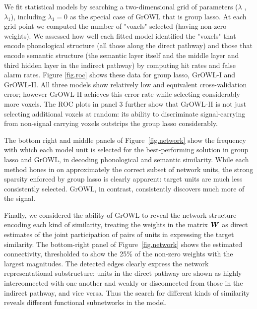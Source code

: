 We fit statistical models by searching a two-dimensional grid of parameters ($\lambda$ , $\lambda_1$), including $\lambda_1=0$ as the special case of GrOWL that is group lasso. At each grid point we computed the number of "voxels" selected (\ie having non-zero weights). We assessed how well each fitted model identified the "voxels" that encode phonological structure (all those along the direct pathway) and those that encode semantic structure (the semantic layer itself and the middle layer and third hidden layer in the indirect pathway) by computing hit rates and false alarm rates. Figure \ref{fig.roc} shows these data for group lasso, GrOWL-I and GrOWL-II. All three models show relatively low and equivalent cross-validation error; however GrOWL-II achieves this error rate while selecting considerably more voxels. The ROC plots in panel 3 further show that GrOWL-II is not just selecting additional voxels at random: its ability to discriminate signal-carrying from non-signal carrying voxels outstrips the group lasso considerably.

The bottom right and middle panels of Figure~\ref{fig.network} show the frequency with which each model unit is selected for the best-performing solution in group lasso and GrOWL, in decoding phonological and semantic similarity. While each method hones in on approximately the correct subset of network units, the strong sparsity enforced by group lasso is clearly apparent: target units are much less consistently selected. GrOWL, in contrast, consistently discovers much more of the signal. 

Finally, we considered the ability of GrOWL to reveal the network structure encoding each kind of similarity, treating the weights in the matrix $\boldsymbol{W}$ as direct estimates of the joint participation of pairs of units in expressing the target similarity. The bottom-right panel of Figure~\ref{fig.network} shows the estimated connectivity, thresholded to show the 25\% of the non-zero weights with the largest magnitudes. The detected edges clearly express the network representational substructure: units in the direct pathway are shown as highly interconnected with one another and weakly or disconnected from those in the indirect pathway, and vice versa. Thus the search for different kinds of similarity reveals different functional subnetworks in the model.

